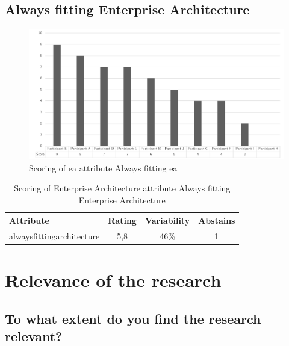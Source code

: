 \subsection{Always fitting Enterprise Architecture}
\begin{figure}[H]
	\centering
	\includegraphics[width=0.9\linewidth]{images/scoreeaalwaysfitea}
	\caption[Scoring of \gls{ea} attribute Always fitting ea]{Scoring of \gls{ea} attribute Always fitting ea}
	\label{fig:appscoringeaalwaysfitea}
\end{figure}
\begin{table}[H]
	\centering
	\begin{tabular}{p{}ccc}
		\toprule
		\textbf{Attribute} & \textbf{Rating} & \textbf{Variability} & \textbf{Abstains} \\
		\midrule
		\Gls{alwaysfittingarchitecture} & 5,8 & 46\% & 1 \\%
		\bottomrule
	\end{tabular}%
	\caption[Scoring of Enterprise Architecture attribute Always fitting Enterprise Architecture]{Scoring of Enterprise Architecture attribute Always fitting Enterprise Architecture}
	\label{tab:appscoringeaalwaysfitea}%
\end{table}%

\section{Relevance of the research}
\label{sec:relevanceofresearchandexpectations}

\subsection{To what extent do you find the research relevant?}
\label{sub:relevantgeneric}

